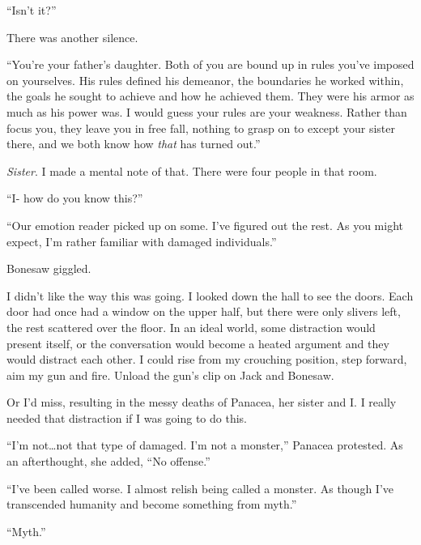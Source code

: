 ``Isn't it?''



There was another silence.



``You're your father's daughter.  Both of you are bound up in rules you've imposed on yourselves.  His rules defined his demeanor, the boundaries he worked within, the goals he sought to achieve and how he achieved them.  They were his armor as much as his power was.  I would guess your rules are your weakness.  Rather than focus you, they leave you in free fall, nothing to grasp on to except your sister there, and we both know how \emph{that} has turned out.''



\emph{Sister}.  I made a mental note of that.  There were four people in that room.



``I- how do you know this?''



``Our emotion reader picked up on some.  I've figured out the rest.  As you might expect, I'm rather familiar with damaged individuals.''



Bonesaw giggled.



I didn't like the way this was going.  I looked down the hall to see the doors.  Each door had once had a window on the upper half, but there were only slivers left, the rest scattered over the floor.  In an ideal world, some distraction would present itself, or the conversation would become a heated argument and they would distract each other.  I could rise from my crouching position, step forward, aim my gun and fire.  Unload the gun's clip on Jack and Bonesaw.



Or I'd miss, resulting in the messy deaths of Panacea, her sister and I.  I really needed that distraction if I was going to do this.



``I'm not\ldots not that type of damaged.  I'm not a monster,'' Panacea protested.  As an afterthought, she added, ``No offense.''



``I've been called worse.  I almost relish being called a monster.  As though I've transcended humanity and become something from myth.''



``Myth.''




